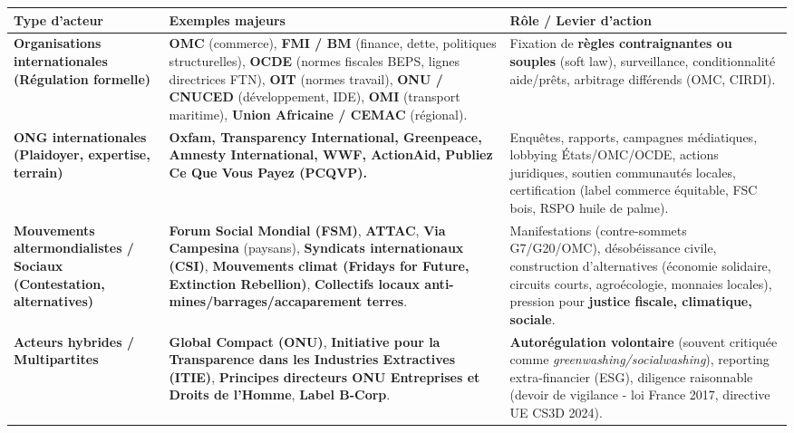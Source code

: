 \documentclass[11pt]{article}
\begin{document}
\begin{center}
\begin{tabularx}{\linewidth}{|l|X|X|}
\hline
\rowcolor{popblueL}
\textbf{Type d'acteur} & \textbf{Exemples majeurs} & \textbf{Rôle / Levier d'action} \\
\hline
\textbf{Organisations internationales (Régulation formelle)} & \textbf{OMC} (commerce), \textbf{FMI / BM} (finance, dette, politiques structurelles), \textbf{OCDE} (normes fiscales BEPS, lignes directrices FTN), \textbf{OIT} (normes travail), \textbf{ONU / CNUCED} (développement, IDE), \textbf{OMI} (transport maritime), \textbf{Union Africaine / CEMAC} (régional). & Fixation de \textbf{règles contraignantes ou souples} (soft law), surveillance, conditionnalité aide/prêts, arbitrage différends (OMC, CIRDI). \\
\hline
\textbf{ONG internationales (Plaidoyer, expertise, terrain)} & \textbf{Oxfam, Transparency International, Greenpeace, Amnesty International, WWF, ActionAid, Publiez Ce Que Vous Payez (PCQVP).} & Enquêtes, rapports, campagnes médiatiques, lobbying États/OMC/OCDE, actions juridiques, soutien communautés locales, certification (label commerce équitable, FSC bois, RSPO huile de palme). \\
\hline
\textbf{Mouvements altermondialistes / Sociaux (Contestation, alternatives)} & \textbf{Forum Social Mondial (FSM)}, \textbf{ATTAC}, \textbf{Via Campesina} (paysans), \textbf{Syndicats internationaux (CSI)}, \textbf{Mouvements climat (Fridays for Future, Extinction Rebellion)}, \textbf{Collectifs locaux anti-mines/barrages/accaparement terres}. & Manifestations (contre-sommets G7/G20/OMC), désobéissance civile, construction d'alternatives (économie solidaire, circuits courts, agroécologie, monnaies locales), pression pour \textbf{justice fiscale, climatique, sociale}. \\
\hline
\textbf{Acteurs hybrides / Multipartites} & \textbf{Global Compact (ONU)}, \textbf{Initiative pour la Transparence dans les Industries Extractives (ITIE)}, \textbf{Principes directeurs ONU Entreprises et Droits de l'Homme}, \textbf{Label B-Corp}. & \textbf{Autorégulation volontaire} (souvent critiquée comme \emph{greenwashing/socialwashing}), reporting extra-financier (ESG), diligence raisonnable (devoir de vigilance - loi France 2017, directive UE CS3D 2024). \\
\hline
\end{tabularx}
\end{center}
\end{document}
